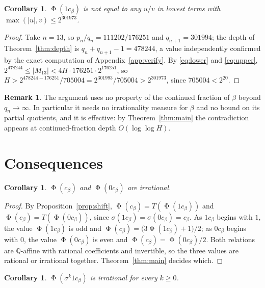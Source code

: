 \documentclass[11pt,reqno]{amsart}
\theoremstyle{plain}
\newtheorem{corollary}[theorem]{Corollary}
\theoremstyle{definition}
\newtheorem{remark}[theorem]{Remark}
\newcommand{\Q}{\mathbb{Q}}
\DeclareMathOperator{\Ph}{\Phi}
\begin{document}
\begin{corollary}\label{cor:shadow}
$\Ph(1c_\beta)$ is not equal to any $u/v$ in lowest terms with
$\max(|u|,v)\le 2^{301973}$.
\end{corollary}

\begin{proof}
Take $n=13$, so $p_n/q_n=111202/176251$ and $q_{n+1}=301994$; the depth
of Theorem~\ref{thm:depth} is $q_n+q_{n+1}-1=478244$, a value independently
confirmed by the exact computation of Appendix~\ref{app:verify}. By
\eqref{eq:lower} and \eqref{eq:upper},
$2^{478244}\le|M_{13}|<4H\cdot176251\cdot 2^{176251}$, so
$H>2^{478244-176251}/705004=2^{301993}/705004>2^{301973}$, since
$705004<2^{20}$.
\end{proof}

\begin{remark}
The argument uses no property of the continued fraction of $\beta$ beyond
$q_n\to\infty$. In particular it needs no irrationality measure for $\beta$ and
no bound on its partial quotients, and it is effective: by
Theorem~\ref{thm:main} the contradiction appears at continued-fraction depth
$O(\log\log H)$.
\end{remark}

\section{Consequences}\label{sec:cor}

\begin{corollary}\label{cor:variants}
$\Ph(c_\beta)$ and $\Ph(0c_\beta)$ are irrational.
\end{corollary}

\begin{proof}
By Proposition~\ref{prop:shift}, $\Ph(c_\beta)=T(\Ph(1c_\beta))$ and
$\Ph(c_\beta)=T(\Ph(0c_\beta))$, since $\sigma(1c_\beta)=\sigma(0c_\beta)=c_\beta$.
As $1c_\beta$ begins with $1$, the value $\Ph(1c_\beta)$ is odd and
$\Ph(c_\beta)=\bigl(3\Ph(1c_\beta)+1\bigr)/2$; as $0c_\beta$ begins with $0$, the
value $\Ph(0c_\beta)$ is even and $\Ph(c_\beta)=\Ph(0c_\beta)/2$. Both relations
are $\Q$-affine with rational coefficients and invertible, so the three values
are rational or irrational together. Theorem~\ref{thm:main} decides which.
\end{proof}

\begin{corollary}\label{cor:shifts}
$\Ph(\sigma^{k}1c_\beta)$ is irrational for every $k\ge0$.
\end{corollary}
\end{document}
